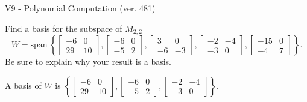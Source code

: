 \begin{exercise}
  \begin{exerciseTitle}V9 - Polynomial Computation (ver. 481)\end{exerciseTitle}
  \begin{exerciseStatement}
    Find a basis for the subspace of \(M_{2,2}\) 
\[W=\mathrm{span}\ \left\{\left[\begin{array}{cc}
-6 & 0 \\
29 & 10
\end{array}\right] , \left[\begin{array}{cc}
-6 & 0 \\
-5 & 2
\end{array}\right] , \left[\begin{array}{cc}
3 & 0 \\
-6 & -3
\end{array}\right] , \left[\begin{array}{cc}
-2 & -4 \\
-3 & 0
\end{array}\right] , \left[\begin{array}{cc}
-15 & 0 \\
-4 & 7
\end{array}\right]\right\}.\]
 Be sure to explain why your result is a basis.


  \end{exerciseStatement}
  \begin{exerciseAnswer}
   A basis of \(W\) is  \(\left\{\left[\begin{array}{cc}
-6 & 0 \\
29 & 10
\end{array}\right] , \left[\begin{array}{cc}
-6 & 0 \\
-5 & 2
\end{array}\right] , \left[\begin{array}{cc}
-2 & -4 \\
-3 & 0
\end{array}\right]\right\}\).
  


  \end{exerciseAnswer}
\end{exercise}